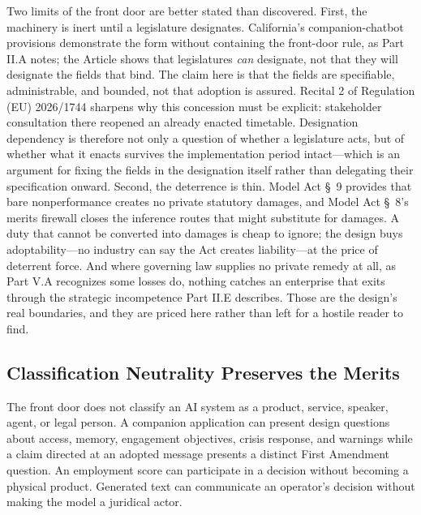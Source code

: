 Two limits of the front door are better stated than discovered. First, the machinery is inert until a legislature designates. California's companion-chatbot provisions demonstrate the form without containing the front-door rule, as Part II.A notes; the Article shows that legislatures \emph{can} designate, not that they will designate the fields that bind. The claim here is that the fields are specifiable, administrable, and bounded, not that adoption is assured. Recital 2 of Regulation (EU) 2026/1744 sharpens why this concession must be explicit: stakeholder consultation there reopened an already enacted timetable. Designation dependency is therefore not only a question of whether a legislature acts, but of whether what it enacts survives the implementation period intact---which is an argument for fixing the fields in the designation itself rather than delegating their specification onward. Second, the deterrence is thin. Model Act \S~9 provides that bare nonperformance creates no private statutory damages, and Model Act \S~8's merits firewall closes the inference routes that might substitute for damages. A duty that cannot be converted into damages is cheap to ignore; the design buys adoptability---no industry can say the Act creates liability---at the price of deterrent force. And where governing law supplies no private remedy at all, as Part V.A recognizes some losses do, nothing catches an enterprise that exits through the strategic incompetence Part II.E describes. Those are the design's real boundaries, and they are priced here rather than left for a hostile reader to find.

\subsection{Classification Neutrality Preserves the Merits}

The front door does not classify an AI system as a product, service, speaker, agent, or legal person. A companion application can present design questions about access, memory, engagement objectives, crisis response, and warnings while a claim directed at an adopted message presents a distinct First Amendment question. An employment score can participate in a decision without becoming a physical product. Generated text can communicate an operator's decision without making the model a juridical actor.

